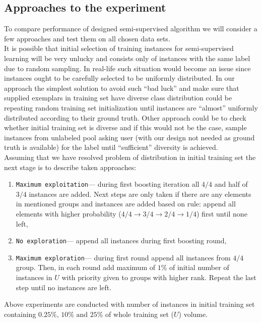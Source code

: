 \documentclass[12pt, a4paper, pdflatex]{report}
\begin{document}
\subsection{Approaches to the experiment\label{sec:experimetnapproach}}
To compare performance of designed semi-supervised algorithm we will consider a few approaches and test them on all chosen data sets.\\
It is possible that initial selection of training instances for semi-supervised learning will be very unlucky and consists only of instances with the same label due to random sampling. 
In real-life such situation would become an issue since instances ought to be carefully selected to be uniformly distributed.
In our approach the simplest solution to avoid such ``bad luck'' and make sure that supplied exemplars in training set have diverse class distribution could be repeating random training set initialization until instances are ``almost'' uniformly distributed according to their ground truth. Other approach could be to check whether initial training set is diverse and if this would not be the case, sample instances from unlabeled pool asking user (with our design not needed as ground truth is available) for the label until ``sufficient'' diversity is achieved.\\

Assuming that we have resolved problem of distribution in initial training set the next stage is to describe taken approaches:
\begin{enumerate}
\item \texttt{Maximum exploitation}--- during first boosting iteration all $4/4$ and half of $3/4$ instances are added. Next steps are only taken if there are any elements in mentioned groups and instances are added based on rule: append all elements with higher probability ($4/4\rightarrow3/4\rightarrow2/4\rightarrow1/4$) first until none left,
\item \texttt{No exploration}--- append all instances during first boosting round,
\item \texttt{Maximum exploration}--- during first round append all instances from $4/4$ group. Then, in each round add maximum of $1\%$ of initial number of instances in $U$ with priority given to groups with higher rank. Repeat the last step until no instances are left.
\end{enumerate}
Above experiments are conducted with number of instances in initial training set containing $0.25\%\text{, } 10\% \text{ and } 25\%$ of whole training set ($U$) volume.
\end{document}
